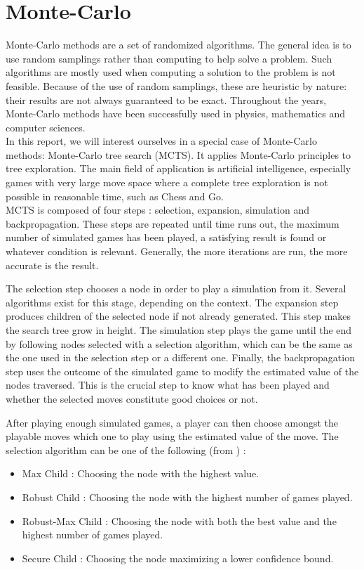 \section{Monte-Carlo}

Monte-Carlo methods are a set of randomized algorithms. The general idea is to use random samplings rather than computing to help solve a problem. Such algorithms are mostly used when computing a solution to the problem is not feasible. Because of the use of random samplings, these are heuristic by nature: their results are not always guaranteed to be exact. Throughout the years, Monte-Carlo methods have been successfully used in physics, mathematics  and computer sciences.\\


In this report, we will interest ourselves in a special case of Monte-Carlo methods: Monte-Carlo tree search (MCTS). It applies Monte-Carlo principles to tree exploration. The main field of application is artificial intelligence, especially games with very large move space where a complete tree exploration is not possible in reasonable time, such as Chess and Go.\\

MCTS is composed of four steps : selection, expansion, simulation and backpropagation. These steps are repeated until time runs out, the maximum number of simulated games has been played, a satisfying result is found or whatever condition is relevant. Generally, the more iterations are run, the more accurate is the result.

The selection step chooses a node in order to play a simulation from it. Several algorithms exist for this stage, depending on the context. The expansion step produces children of the selected node if not already generated. This step makes the search tree grow in height. The simulation step plays the game until the end by following nodes selected with a selection algorithm, which can be the same as the one used in the selection step or a different one. Finally, the backpropagation step uses the outcome of the simulated game to modify the estimated value of the nodes traversed. This is the crucial step to know what has been played and whether the selected moves constitute good choices or not.

After playing enough simulated games, a player can then choose amongst the playable moves which one to play using the estimated value of the move. The selection algorithm can be one of the following (from \cite{ChaPHD}) :
\begin{itemize}
\item Max Child : Choosing the node with the highest value.
\item Robust Child : Choosing the node with the highest number of games played.
\item Robust-Max Child : Choosing the node with both the best value and the highest number of games played.
\item Secure Child : Choosing the node maximizing a lower confidence bound.\\
\end{itemize}


